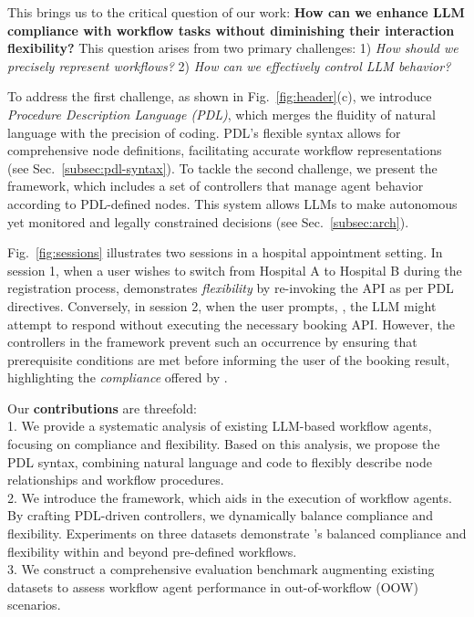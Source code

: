 This brings us to the critical question of our work: \textbf{How can we enhance LLM compliance with workflow tasks without diminishing their interaction flexibility?}
This question arises from two primary challenges: 1) \emph{How should we precisely represent workflows?} 2) \emph{How can we effectively control LLM behavior?}

To address the first challenge, as shown in Fig.~\ref{fig:header}(c), we introduce \emph{Procedure Description Language (PDL)}, which merges the fluidity of natural language with the precision of coding. PDL's flexible syntax allows for comprehensive node definitions, facilitating accurate workflow representations (see Sec.~\ref{subsec:pdl-syntax}).
To tackle the second challenge, we present the \model framework, which includes a set of controllers that manage agent behavior according to PDL-defined nodes. This system allows LLMs to make autonomous yet monitored and legally constrained decisions (see Sec.~\ref{subsec:arch}).

Fig.~\ref{fig:sessions} illustrates two sessions in a hospital appointment setting. In session 1, when a user wishes to switch from Hospital A to Hospital B during the registration process, \model demonstrates \emph{flexibility} by re-invoking the  API as per PDL directives. Conversely, in session 2, when the user prompts, , the LLM might attempt to respond without executing the necessary booking API. However, the controllers in the \model framework prevent such an occurrence by ensuring that prerequisite conditions are met before informing the user of the booking result, highlighting the \emph{compliance} offered by \model. 

Our \textbf{contributions} are threefold: \\
1. We provide a systematic analysis of existing LLM-based workflow agents, focusing on compliance and flexibility. Based on this analysis, we propose the PDL syntax, combining natural language and code to flexibly describe node relationships and workflow procedures. \\
2. We introduce the \model framework, which aids in the execution of workflow agents. By crafting PDL-driven controllers, we dynamically balance compliance and flexibility. Experiments on three datasets demonstrate \model's balanced compliance and flexibility within and beyond pre-defined workflows. \\
3. We construct a comprehensive evaluation benchmark augmenting existing datasets to assess workflow agent performance in out-of-workflow (OOW) scenarios. 
